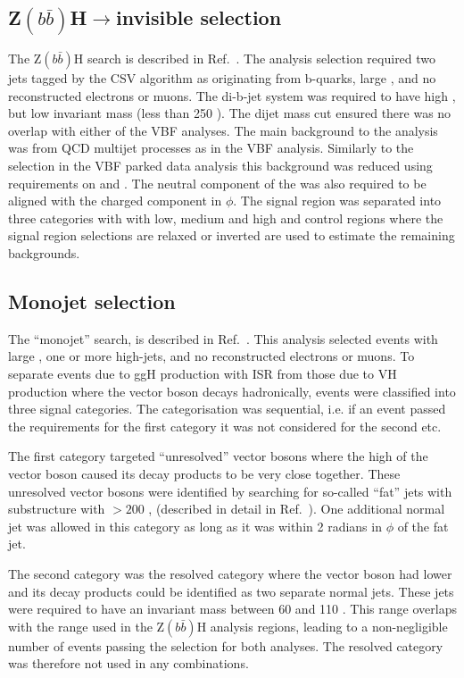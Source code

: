 \subsection{Z$(b\bar{b})$H$\rightarrow$invisible selection}
\label{sec:zbbh}
The Z$(b\bar{b})$H search is described in Ref.~\cite{CMS-PAS-HIG-13-028}. The analysis selection required two jets tagged by the \ac{CSV} algorithm as originating from b-quarks, large \MET, and no reconstructed electrons or muons. The di-b-jet system was required to have high \pt, but low invariant mass (less than 250 \GeV). The dijet mass cut ensured there was no overlap with either of the \ac{VBF} analyses. The main background to the analysis was from \ac{QCD} multijet processes as in the \ac{VBF} analysis. Similarly to the selection in the \ac{VBF} parked data analysis this background was reduced using requirements on \jetmetdphi and \METsig. The neutral component of the \MET was also required to be aligned with the charged component in $\phi$. The signal region was separated into three categories with with low, medium and high \MET and control regions where the signal region selections are relaxed or inverted are used to estimate the remaining backgrounds.

\subsection{Monojet selection}
\label{sec:monojet}
The ``monojet'' search, is described in Ref.~\cite{CMS-PAS-EXO-12-055}. This analysis selected events with large \MET, one or more high-\pt jets, and no reconstructed electrons or muons. To separate events due to \ac{ggH} production with \ac{ISR} from those due to \ac{VH} production where the vector boson decays hadronically, events were classified into three signal categories. The categorisation was sequential, i.e. if an event passed the requirements for the first category it was not considered for the second etc. 

The first category targeted ``unresolved'' vector bosons where the high \pt of the vector boson caused its decay products to be very close together. These unresolved vector bosons were identified by searching for so-called ``fat'' jets with substructure with \pt$>200$ \GeV, (described in detail in Ref.~\cite{CMS-PAS-EXO-12-055}). One additional normal jet was allowed in this category as long as it was within 2 radians in $\phi$ of the fat jet.

The second category was the resolved category where the vector boson had lower \pt and its decay products could be identified as two separate normal jets. These jets were required to have an invariant mass between 60 and 110 \GeV. This range overlaps with the range used in the Z$(b\bar{b})$H analysis regions, leading to a non-negligible number of events passing the selection for both analyses. The resolved category was therefore not used in any combinations.

